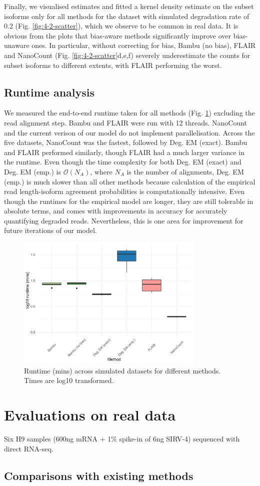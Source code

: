 \newpage

Finally, we visualised estimates and fitted a kernel density estimate on the subset isoforms only for all methods for the dataset with simulated degradation rate of 0.2 (Fig. \ref{fig:4-2-scatter}), which we observe to be common in real data. It is obvious from the plots that bias-aware methods significantly improve over bias-unaware ones. In particular, without correcting for bias, Bambu (no bias), FLAIR and NanoCount (Fig. \ref{fig:4-2-scatter}d,e,f) severely underestimate the counts for subset isoforms to different extents, with FLAIR performing the worst.

\subsection{Runtime analysis}

We measured the end-to-end runtime taken for all methods (Fig. \ref{fig:runtime}) excluding the read alignment step. Bambu and FLAIR were run with 12 threads. NanoCount and the current verison of our model do not implement parallelisation. Across the five datasets, NanoCount was the fastest, followed by Deg. EM (exact). Bambu and FLAIR performed similarly, though FLAIR had a much larger variance in the runtime. Even though the time complexity for both Deg. EM (exact) and Deg. EM (emp.) is $\mathcal{O}(N_A)$, where $N_A$ is the number of alignments, Deg. EM (emp.) is much slower than all other methods because calculation of the empirical read length-isoform agreement probabilities is computationally intensive. Even though the runtimes for the empirical model are longer, they are still tolerable in absolute terms, and comes with improvements in accuracy for accurately quantifying degraded reads. Nevertheless, this is one area for improvement for future iterations of our model.  

\begin{figure}[H]
    \centering
    \includegraphics[width=0.8\textwidth]{figures/sec-4-runtime.png}
    \caption[Runtime across simulated datasets for different methods]{Runtime (mins) across simulated datasets for different methods. Times are log10 transformed.}
    \label{fig:runtime}
\end{figure}

\section{Evaluations on real data}

Six H9 samples (600ng mRNA + 1\% spike-in of 6ng SIRV-4) sequenced with direct RNA-seq.

\subsection{Comparisons with existing methods}